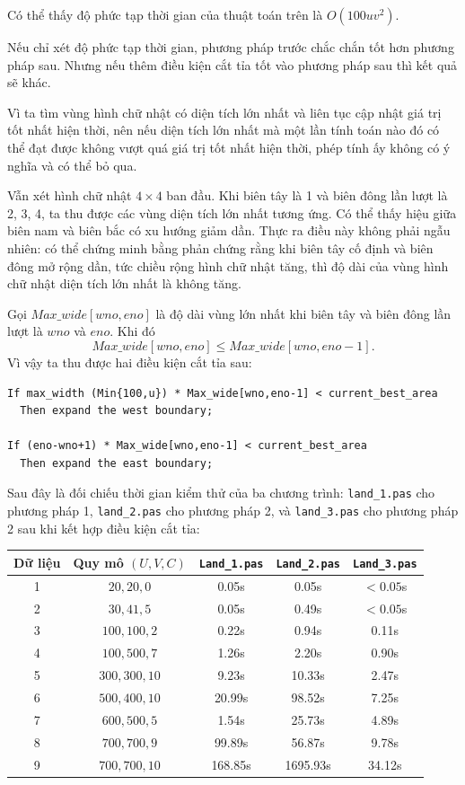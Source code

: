 \documentclass[11pt]{article}
\begin{document}
Có thể thấy độ phức tạp thời gian của thuật toán trên là \(O(100uv^2)\).

Nếu chỉ xét độ phức tạp thời gian, phương pháp trước chắc chắn tốt hơn
phương pháp sau. Nhưng nếu thêm điều kiện cắt tỉa tốt vào phương pháp sau thì
kết quả sẽ khác.

Vì ta tìm vùng hình chữ nhật có diện tích lớn nhất và liên tục cập nhật giá
trị tốt nhất hiện thời, nên nếu diện tích lớn nhất mà một lần tính toán nào
đó có thể đạt được không vượt quá giá trị tốt nhất hiện thời, phép tính ấy
không có ý nghĩa và có thể bỏ qua.

Vẫn xét hình chữ nhật \(4\times4\) ban đầu. Khi biên tây là 1 và biên đông
lần lượt là 2, 3, 4, ta thu được các vùng diện tích lớn nhất tương ứng. Có
thể thấy hiệu giữa biên nam và biên bắc có xu hướng giảm dần. Thực ra điều
này không phải ngẫu nhiên: có thể chứng minh bằng phản chứng rằng khi biên
tây cố định và biên đông mở rộng dần, tức chiều rộng hình chữ nhật tăng, thì
độ dài của vùng hình chữ nhật diện tích lớn nhất là không tăng.

Gọi \(Max\_wide[wno,eno]\) là độ dài vùng lớn nhất khi biên tây và biên đông
lần lượt là \(wno\) và \(eno\). Khi đó
\[
Max\_wide[wno,eno]\le Max\_wide[wno,eno-1].
\]
Vì vậy ta thu được hai điều kiện cắt tỉa sau:

\begin{verbatim}
If max_width (Min{100,u}) * Max_wide[wno,eno-1] < current_best_area
  Then expand the west boundary;

If (eno-wno+1) * Max_wide[wno,eno-1] < current_best_area
  Then expand the east boundary;
\end{verbatim}

Sau đây là đối chiếu thời gian kiểm thử của ba chương trình:
\texttt{land\_1.pas} cho phương pháp 1, \texttt{land\_2.pas} cho phương pháp
2, và \texttt{land\_3.pas} cho phương pháp 2 sau khi kết hợp điều kiện cắt
tỉa:

\begin{center}
\begin{tabular}{c c c c c}
\hline
Dữ liệu & Quy mô \((U,V,C)\) & \texttt{Land\_1.pas} &
\texttt{Land\_2.pas} & \texttt{Land\_3.pas}\\
\hline
1 & \(20,20,0\) & 0.05s & 0.05s & \(<0.05\)s\\
2 & \(30,41,5\) & 0.05s & 0.49s & \(<0.05\)s\\
3 & \(100,100,2\) & 0.22s & 0.94s & 0.11s\\
4 & \(100,500,7\) & 1.26s & 2.20s & 0.90s\\
5 & \(300,300,10\) & 9.23s & 10.33s & 2.47s\\
6 & \(500,400,10\) & 20.99s & 98.52s & 7.25s\\
7 & \(600,500,5\) & 1.54s & 25.73s & 4.89s\\
8 & \(700,700,9\) & 99.89s & 56.87s & 9.78s\\
9 & \(700,700,10\) & 168.85s & 1695.93s & 34.12s\\
\hline
\end{tabular}
\end{center}
\end{document}
